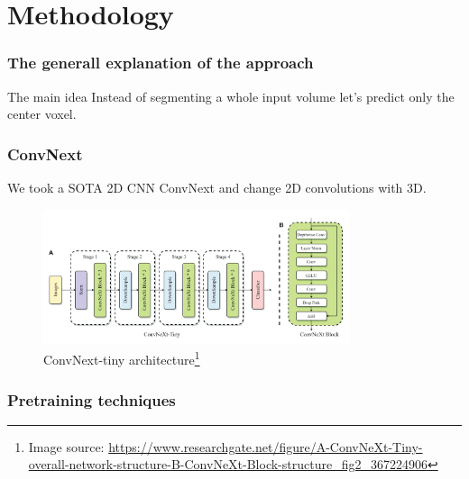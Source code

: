 \documentclass{beamer}
\begin{document}
\section{Methodology}

\begin{frame}
    \frametitle{The generall explanation of the approach}
    \begin{block}{The main idea}
        Instead of segmenting a whole input volume let's predict only the center voxel.
    \end{block}
\end{frame}

\begin{frame}
    \frametitle{ConvNext}
    We took a SOTA 2D CNN ConvNext\cite{liu2022convnet} and change 2D convolutions with 3D.
    \begin{figure}
        \includegraphics[width=0.8\textwidth]{convnext.png}
        \caption{ConvNext-tiny architecture\footnote{Image source: \url{https://www.researchgate.net/figure/A-ConvNeXt-Tiny-overall-network-structure-B-ConvNeXt-Block-structure_fig2_367224906}}}
    \end{figure}
\end{frame}

\begin{frame}
    \frametitle{Pretraining techniques}



\end{frame}
\end{document}
